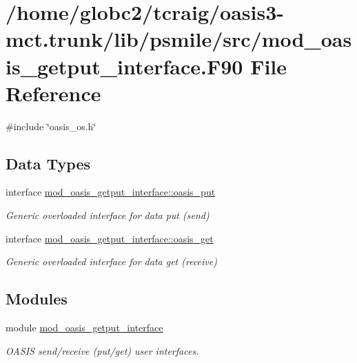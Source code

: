 \hypertarget{mod__oasis__getput__interface_8_f90}{}\section{/home/globc2/tcraig/oasis3-\/mct.trunk/lib/psmile/src/mod\+\_\+oasis\+\_\+getput\+\_\+interface.F90 File Reference}
\label{mod__oasis__getput__interface_8_f90}
{\ttfamily \#include \char`\"{}oasis\+\_\+os.\+h\char`\"{}}\newline
\subsection*{Data Types}
\begin{DoxyCompactItemize}
\item 
interface \hyperlink{interfacemod__oasis__getput__interface_1_1oasis__put}{mod\+\_\+oasis\+\_\+getput\+\_\+interface\+::oasis\+\_\+put}
\begin{DoxyCompactList}\small\item\em Generic overloaded interface for data put (send) \end{DoxyCompactList}\item 
interface \hyperlink{interfacemod__oasis__getput__interface_1_1oasis__get}{mod\+\_\+oasis\+\_\+getput\+\_\+interface\+::oasis\+\_\+get}
\begin{DoxyCompactList}\small\item\em Generic overloaded interface for data get (receive) \end{DoxyCompactList}\end{DoxyCompactItemize}
\subsection*{Modules}
\begin{DoxyCompactItemize}
\item 
module \hyperlink{namespacemod__oasis__getput__interface}{mod\+\_\+oasis\+\_\+getput\+\_\+interface}
\begin{DoxyCompactList}\small\item\em O\+A\+S\+IS send/receive (put/get) user interfaces. \end{DoxyCompactList}\end{DoxyCompactItemize}
